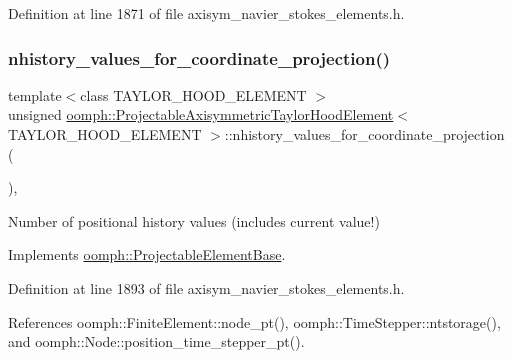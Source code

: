 Definition at line 1871 of file axisym\+\_\+navier\+\_\+stokes\+\_\+elements.\+h.

\mbox{\label{classoomph_1_1ProjectableAxisymmetricTaylorHoodElement_a88869af2e716697b7d9296c9de2af9bf}} 
\subsubsection{\texorpdfstring{nhistory\+\_\+values\+\_\+for\+\_\+coordinate\+\_\+projection()}{nhistory\_values\_for\_coordinate\_projection()}}
{\footnotesize\ttfamily template$<$class T\+A\+Y\+L\+O\+R\+\_\+\+H\+O\+O\+D\+\_\+\+E\+L\+E\+M\+E\+NT $>$ \\
unsigned \hyperlink{classoomph_1_1ProjectableAxisymmetricTaylorHoodElement}{oomph\+::\+Projectable\+Axisymmetric\+Taylor\+Hood\+Element}$<$ T\+A\+Y\+L\+O\+R\+\_\+\+H\+O\+O\+D\+\_\+\+E\+L\+E\+M\+E\+NT $>$\+::nhistory\+\_\+values\+\_\+for\+\_\+coordinate\+\_\+projection (\begin{DoxyParamCaption}{ }\end{DoxyParamCaption})\hspace{0.3cm}{\ttfamily [inline]}, {\ttfamily [virtual]}}



Number of positional history values (includes current value!) 



Implements \hyperlink{classoomph_1_1ProjectableElementBase_ab4ecd0cd24000a3ed675dc7198203c1f}{oomph\+::\+Projectable\+Element\+Base}.



Definition at line 1893 of file axisym\+\_\+navier\+\_\+stokes\+\_\+elements.\+h.



References oomph\+::\+Finite\+Element\+::node\+\_\+pt(), oomph\+::\+Time\+Stepper\+::ntstorage(), and oomph\+::\+Node\+::position\+\_\+time\+\_\+stepper\+\_\+pt().

